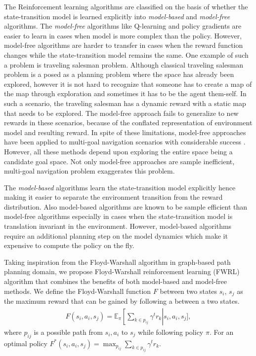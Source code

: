 \documentclass[letterpaper]{article} %
\def\state{s}
\def\act{a}
\def\E{\mathbb{E}}
\newcommand{\state}[2]{\mathbf{s}^{#1}(#2)}
\newcommand{\discount}{\gamma}
\begin{document}
The Reinforcement learning algorithms are classified on the basis of whether
the state-transition model is learned explicitly into \emph{model-based}
and \emph{model-free} algorithms.
%
The \emph{model-free} algorithms like Q-learning and policy gradients are easier to learn in cases when model is more complex than the policy.
However, model-free algorithms are harder to transfer in cases when the reward function changes while the state-transition model remains the same.
One example of such a problem is traveling salesman problem.
Although classical traveling salesman problem is a posed as a planning problem where the space has already been explored, however it is not hard to recognize that someone has to create a map of the map through exploration and sometimes it has to be the agent them-self.
In such a scenario, the traveling salesman has a dynamic reward with a static map that needs to be
explored.
The model-free approach fails to generalize to new rewards in these scenarios, because of the conflated representation of environment model and resulting reward.
In spite of these limitations, model-free approaches have been applied to multi-goal navigation
scenarios with considerable success \cite{mirowski2018learning,schaul2015universal}.
However, all these methods depend upon exploring the entire space being a candidate goal space.
Not only model-free approaches are sample inefficient, multi-goal navigation problem exaggerates this problem.

The \emph{model-based} algorithms learn the state-transition model explicitly hence making it
easier to separate the environment transition from the reward distribution. Also model-based
algorithms are known to be sample efficient than model-free algorithms especially in cases when
the state-transition model is translation invariant in the environment. 
However, model-based algorithms require an additional planning step on the model dynamics
which make it expensive to compute the policy on the fly.

Taking inspiration from the Floyd-Warshall algorithm in graph-based path planning domain, we propose Floyd-Warshall reinforcement learning (FWRL) algorithm that combines the benefits of both
model-based and model-free methods.
We define the Floyd-Warshall function $F$ between two states $\state_i$, $\state_j$ as the maximum reward that can be gained by following a between a two states.
\begin{align}
F(\state_i, \act_i, \state_j) = \E_{\pi}\left[
\sum_{k \in p_{ij} } \discount^{t} r_{k} \right| \state_i, \act_i, \state_j\Biggr],
\end{align}
where $p_{ij}$ is a possible path from $\state_i, \act_i$ to $\state_j$ while following policy $\pi$. For an optimal policy $
F^*(\state_i, \act_i, \state_j) = \max_{p_{ij}} \sum_{k \in p_{ij} } \discount^{t} r_{k}$.
\end{document}

